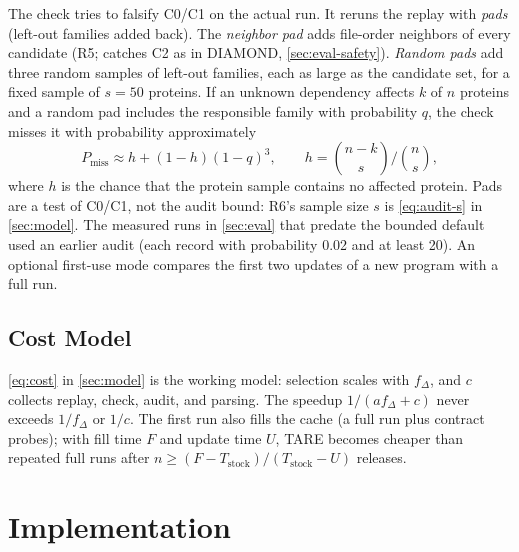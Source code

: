 \documentclass[letterpaper,twocolumn,10pt]{article}
\theoremstyle{definition}
\newcommand{\sys}{TARE\xspace}
\newcommand{\sys}{PARE\xspace}
\begin{document}
The check tries to falsify C0/C1 on the actual run. It reruns the replay with \textit{pads} (left\nobreakdash-out families added
back). The \textit{neighbor pad} adds file\nobreakdash-order neighbors of every candidate (R5; catches C2 as in DIAMOND,
\cref{sec:eval-safety}). \textit{Random pads} add three random samples of left\nobreakdash-out families, each as large as the
candidate set, for a fixed sample of $s=50$ proteins.
If an unknown dependency affects $k$ of $n$ proteins and a random pad includes the responsible family with probability
$q$, the check misses it with probability approximately
\begin{equation}
P_{\text{miss}} \approx h + (1-h)(1-q)^3, \qquad h = \binom{n-k}{s}\Big/\binom{n}{s},
\label{eq:miss}
\end{equation}
where $h$ is the chance that the protein sample contains no affected protein. Pads are a test of C0/C1, not the audit
bound: R6's sample size $s$ is \cref{eq:audit-s} in \cref{sec:model}. The measured runs in \cref{sec:eval} that predate
the bounded default used an earlier audit (each record with probability 0.02 and at least 20). An optional
first\nobreakdash-use mode compares the first two updates of a new program with a full run.

\subsection{Cost Model}
\label{sec:cost}

\cref{eq:cost} in \cref{sec:model} is the working model: selection scales with $f_\Delta$, and $c$ collects replay,
check, audit, and parsing. The speedup $1/(a f_\Delta + c)$ never exceeds $1/f_\Delta$ or $1/c$. The first run also
fills the cache (a full run plus contract probes); with fill time $F$ and update time $U$, \sys becomes cheaper than
repeated full runs after $n \ge (F - T_{\mathrm{stock}})/(T_{\mathrm{stock}} - U)$ releases.

\section{Implementation}
\label{sec:impl}
\end{document}
